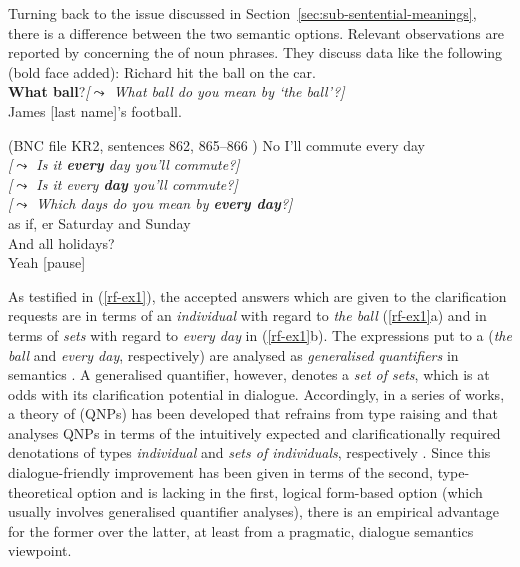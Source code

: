 \documentclass[output=paper
	        ,collection
	        ,collectionchapter
 	        ,biblatex
                ,babelshorthands
                ,newtxmath
                ,draftmode
                ,colorlinks, citecolor=brown
]{langscibook}
\begin{document}
Turning back to the issue discussed in Section~\ref{sec:sub-sentential-meanings}, there is a difference between the two semantic options.
%
Relevant observations are reported by \citet{Purver:Ginzburg:2004} concerning the  of noun phrases.
%
They discuss data like the following (bold face added):
%
\ea \label{rf-ex1}
  \ea  {} Richard hit the ball on the car. \\
 \textbf{What ball}?\hspace*{0.25cm}\emph{[$\leadsto$ What ball do you mean by  `the ball'?]} \\
 James [last name]'s football. \par\smallskip
\hfill (BNC file KR2, sentences 862, 865--866 )
  \ex {} No I'll commute every day \\
 \emph{[$\leadsto$ Is it \textbf{every} day you'll commute?]}\\
 \emph{[$\leadsto$ Is it every \textbf{day} you'll commute?]}\\
 \emph{[$\leadsto$ Which days do you mean by \textbf{every day}?]}\\
 as if, er Saturday and Sunday \\
 And all holidays? \\
 Yeah [pause]
  \z
\z

As testified in (\ref{rf-ex1}), the accepted answers which are given to the clarification requests are in terms of an \emph{individual} with regard to \textit{the ball} (\ref{rf-ex1}a) and in terms of \emph{sets} with regard to \textit{every day} in (\ref{rf-ex1}b).
%
The expressions put to a  (\textit{the ball} and \textit{every day}, respectively) are analysed as \emph{generalised quantifiers}  in semantics \citep{montague73}.
%
A generalised quantifier, however, denotes a \emph{set of sets}, which is at odds with its clarification potential in dialogue. 
%
Accordingly, in a series of works, a theory of  (QNPs) has been developed that refrains from type raising and that analyses QNPs in terms of the intuitively expected and clarificationally required denotations of types \emph{individual} and \emph{sets of individuals}, respectively  \citep{Purver:Ginzburg:2004,Ginzburg:Purver:2012,Ginzburg:2012,Cooper:2013,Luecking:Ginzburg:2018,Cooper:ms}. 
%
Since this dialogue-friendly improvement has been given in terms of the second, type-theoretical option and is lacking in the first, logical form-based option (which usually involves generalised quantifier analyses), there is an empirical advantage for the former over the latter, at least from a pragmatic, dialogue semantics viewpoint.
\end{document}
